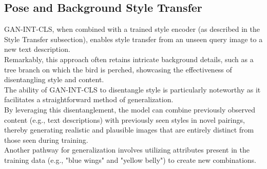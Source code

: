 \subsection*{Pose and Background Style Transfer}

GAN-INT-CLS, when combined with a trained style 
encoder (as described in the Style Transfer 
subsection), enables style transfer from an unseen query 
image to a new text description. 
\\
Remarkably, this approach often retains intricate 
background details, such as a tree branch on which 
the bird is perched, showcasing the effectiveness
of disentangling style and content.
\\
The ability of GAN-INT-CLS to disentangle style is 
particularly noteworthy as it facilitates a 
straightforward method of generalization. 
\\
By leveraging this disentanglement, the model can 
combine previously observed content 
(e.g., text descriptions) with previously seen styles 
in novel pairings, thereby generating realistic 
and plausible images that are entirely distinct from 
those seen during training. 
\\
Another pathway for generalization involves utilizing 
attributes present in the training data
(e.g., "blue wings" and "yellow belly") to create new 
combinations. 
\\
